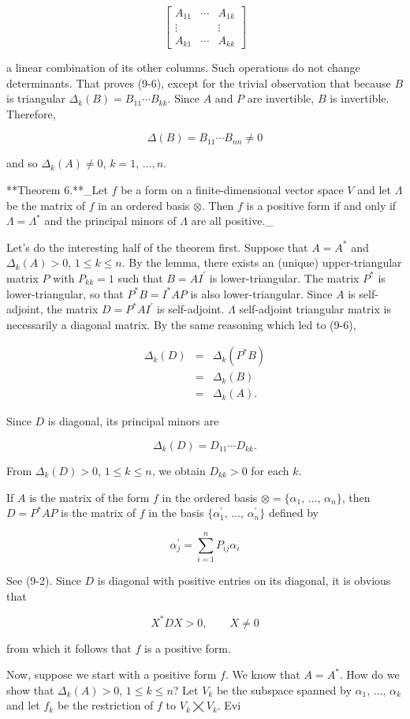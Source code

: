 \[\begin{bmatrix}A_{11}&\cdots&A_{1k}\\ \vdots&&\vdots\\ A_{k1}&\cdots&A_{kk}\end{bmatrix}\]

a linear combination of its other columns. Such operations do not change determinants. That proves (9-6), except for the trivial observation that because \(B\) is triangular \(\Delta_{k}(B)=B_{11}\cdots B_{kk}\). Since \(A\) and \(P\) are invertible, \(B\) is invertible. Therefore,

\[\Delta(B)=B_{11}\cdots B_{nn}\neq 0\]

and so \(\Delta_{k}(A)\neq 0\), \(k=1\), \(\ldots,n\).

**Theorem 6.**_Let \(f\) be a form on a finite-dimensional vector space \(V\) and let \(\Lambda\) be the matrix of \(f\) in an ordered basis \(\otimes\). Then \(f\) is a positive form if and only if \(\Lambda=\Lambda^{*}\) and the principal minors of \(\Lambda\) are all positive._

Let's do the interesting half of the theorem first. Suppose that \(A=A^{*}\) and \(\Delta_{k}(A)>0\), \(1\leq k\leq n\). By the lemma, there exists an (unique) upper-triangular matrix \(P\) with \(P_{kk}=1\) such that \(B=AI^{\prime}\) is lower-triangular. The matrix \(P^{*}\) is lower-triangular, so that \(P^{*}B=I^{*}AP\) is also lower-triangular. Since \(A\) is self-adjoint, the matrix \(D=P^{*}AI^{\prime}\) is self-adjoint. \(\Lambda\) self-adjoint triangular matrix is necessarily a diagonal matrix. By the same reasoning which led to (9-6),

\[\begin{array}{rcl}\Delta_{k}(D)&=&\Delta_{k}(P^{*}B)\\ &=&\Delta_{k}(B)\\ &=&\Delta_{k}(A).\end{array}\]

Since \(D\) is diagonal, its principal minors are

\[\Delta_{k}(D)=D_{11}\cdots D_{kk}.\]

From \(\Delta_{k}(D)>0\), \(1\leq k\leq n\), we obtain \(D_{kk}>0\) for each \(k\).

If \(A\) is the matrix of the form \(f\) in the ordered basis \(\otimes=\{\alpha_{1},\,\ldots,\,\alpha_{n}\}\), then \(D=P^{*}AP\) is the matrix of \(f\) in the basis \(\{\alpha^{\prime}_{1},\,\ldots,\,\alpha^{\prime}_{n}\}\) defined by

\[\alpha^{\prime}_{j}=\sum_{i=1}^{n}P_{ij}\alpha_{i}\]

See (9-2). Since \(D\) is diagonal with positive entries on its diagonal, it is obvious that

\[X^{*}DX>0,\qquad X\neq 0\]

from which it follows that \(f\) is a positive form.

Now, suppose we start with a positive form \(f\). We know that \(A=A^{*}\). How do we show that \(\Delta_{k}(A)>0\), \(1\leq k\leq n\)? Let \(V_{k}\) be the subspace spanned by \(\alpha_{1},\,\ldots,\,\alpha_{k}\) and let \(f_{k}\) be the restriction of \(f\) to \(V_{k}\bigtimes V_{k}\). Evi 